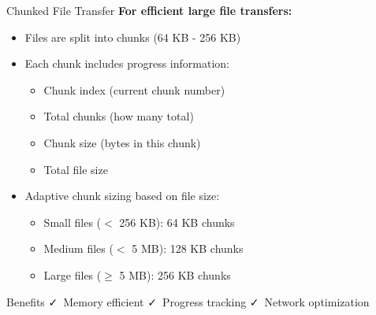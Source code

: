 \documentclass[aspectratio=169]{beamer}
\begin{document}
\begin{frame}{Chunked File Transfer}
\textbf{For efficient large file transfers:}

\begin{itemize}
    \item Files are split into chunks (64 KB - 256 KB)
    \item Each chunk includes progress information:
    \begin{itemize}
        \item Chunk index (current chunk number)
        \item Total chunks (how many total)
        \item Chunk size (bytes in this chunk)
        \item Total file size
    \end{itemize}
    \item Adaptive chunk sizing based on file size:
    \begin{itemize}
        \item Small files ($<$ 256 KB): 64 KB chunks
        \item Medium files ($<$ 5 MB): 128 KB chunks
        \item Large files ($\geq$ 5 MB): 256 KB chunks
    \end{itemize}
\end{itemize}

\vspace{0.3cm}

\begin{block}{Benefits}
\faCheck~Memory efficient \quad \faCheck~Progress tracking \quad \faCheck~Network optimization
\end{block}
\end{frame}
\end{document}
